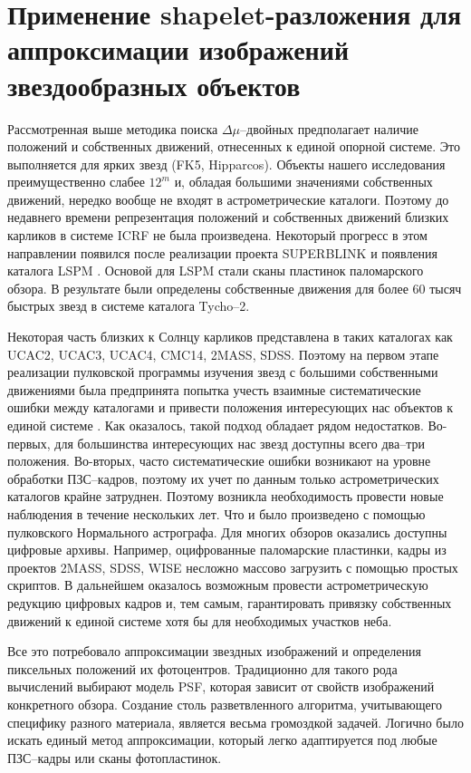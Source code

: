 \chapter{Применение shapelet-разложения для аппроксимации изображений звездообразных объектов} \label{ch:ch2}
Рассмотренная выше методика поиска $\Delta\mu$--двойных предполагает наличие положений и собственных движений, отнесенных к единой опорной системе. Это выполняется для ярких звезд (FK5, Hipparcos). Объекты нашего исследования преимущественно слабее $12^m$ и, обладая большими значениями собственных движений, нередко вообще не входят в астрометрические каталоги. Поэтому до недавнего времени репрезентация положений и собственных движений близких карликов в системе ICRF не была произведена. Некоторый прогресс в этом направлении появился после реализации проекта SUPERBLINK и появления каталога LSPM \cite{2005AJ....129.1483L}. Основой для LSPM стали сканы пластинок паломарского обзора. В результате были определены собственные движения для более 60 тысяч быстрых звезд в системе каталога Tycho--2.

Некоторая часть близких к Солнцу карликов представлена в таких каталогах как UCAC2, UCAC3, UCAC4, CMC14, 2MASS, SDSS. Поэтому на первом этапе реализации пулковской программы изучения звезд с большими собственными движениями была предпринята попытка учесть взаимные систематические ошибки между каталогами и привести положения интересующих нас объектов к единой системе \cite{2011AstL...37..420K}. Как оказалось, такой подход обладает рядом недостатков. Во-первых, для большинства интересующих нас звезд доступны всего два--три положения. Во-вторых, часто систематические ошибки возникают на уровне обработки ПЗС--кадров, поэтому их учет по данным только астрометрических каталогов крайне затруднен. Поэтому возникла необходимость провести новые наблюдения в течение нескольких лет. Что и было произведено с помощью пулковского Нормального астрографа. Для многих обзоров оказались доступны цифровые архивы. Например, оцифрованные паломарские пластинки, кадры из проектов 2MASS, SDSS, WISE несложно массово загрузить с помощью простых скриптов. В дальнейшем оказалось возможным провести астрометрическую редукцию цифровых кадров и, тем самым, гарантировать привязку собственных движений к единой системе хотя бы для необходимых участков неба.

Все это потребовало аппроксимации звездных изображений и определения пиксельных положений их фотоцентров. Традиционно для такого рода вычислений выбирают модель PSF, которая зависит от свойств изображений конкретного обзора. Создание столь разветвленного алгоритма, учитывающего специфику разного материала, является весьма громоздкой задачей. Логично было искать единый метод аппроксимации, который легко адаптируется под любые ПЗС--кадры или сканы фотопластинок.

